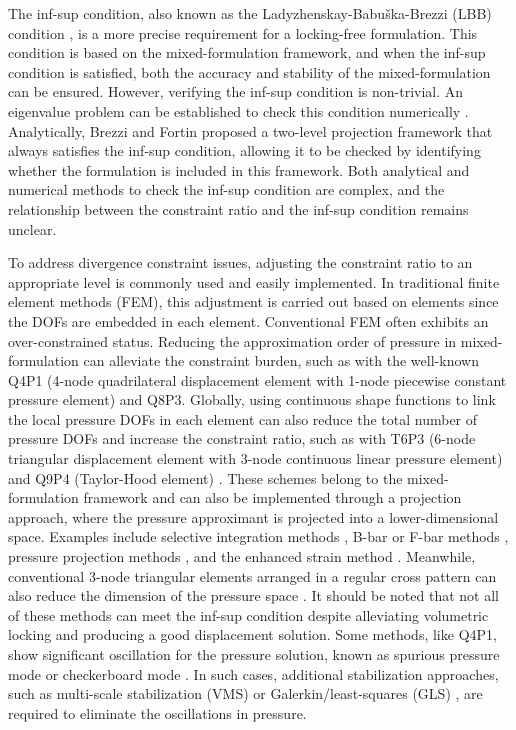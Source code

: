 The inf-sup condition, also known as the Ladyzhenskay-Babuška-Brezzi (LBB) condition \cite{babuska1997a,bathe1996}, is a more precise requirement for a locking-free formulation. This condition is based on the mixed-formulation framework, and when the inf-sup condition is satisfied, both the accuracy and stability of the mixed-formulation can be ensured. However, verifying the inf-sup condition is non-trivial. An eigenvalue problem can be established to check this condition numerically \cite{malkus1981,chapelle1993,brezzi,gallistl2019}. Analytically, Brezzi and Fortin proposed a two-level projection framework that always satisfies the inf-sup condition, allowing it to be checked by identifying whether the formulation is included in this framework. Both analytical and numerical methods to check the inf-sup condition are complex, and the relationship between the constraint ratio and the inf-sup condition remains unclear.

To address divergence constraint issues, adjusting the constraint ratio to an appropriate level is commonly used and easily implemented. In traditional finite element methods (FEM), this adjustment is carried out based on elements since the DOFs are embedded in each element. Conventional FEM often exhibits an over-constrained status. Reducing the approximation order of pressure in mixed-formulation can alleviate the constraint burden, such as with the well-known Q4P1 (4-node quadrilateral displacement element with 1-node piecewise constant pressure element) and Q8P3. Globally, using continuous shape functions to link the local pressure DOFs in each element can also reduce the total number of pressure DOFs and increase the constraint ratio, such as with T6P3 (6-node triangular displacement element with 3-node continuous linear pressure element) and Q9P4 (Taylor-Hood element) \cite{hood1974}. These schemes belong to the mixed-formulation framework and can also be implemented through a projection approach, where the pressure approximant is projected into a lower-dimensional space. Examples include selective integration methods \cite{malkus1978,shilt2020}, B-bar or F-bar methods \cite{simo1990,broccardo2009,coombs2018,saloustros2021,rodriguez2023}, pressure projection methods \cite{simo1985,dohrmann2004}, and the enhanced strain method \cite{lovadina2003}. Meanwhile, conventional 3-node triangular elements arranged in a regular cross pattern can also reduce the dimension of the pressure space \cite{bathe2001}. It should be noted that not all of these methods can meet the inf-sup condition despite alleviating volumetric locking and producing a good displacement solution. Some methods, like Q4P1, show significant oscillation for the pressure solution, known as spurious pressure mode or checkerboard mode \cite{bathe2001}. In such cases, additional stabilization approaches, such as multi-scale stabilization (VMS) \cite{hughes1995,masud2005,rossi2021,karabelas2022} or Galerkin/least-squares (GLS) \cite{hughes1986}, are required to eliminate the oscillations in pressure.

